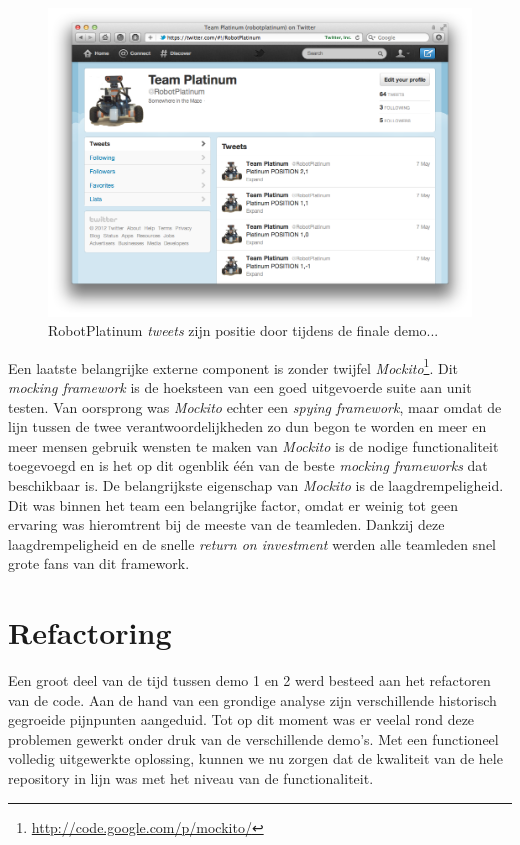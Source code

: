 \documentclass[12pt,a4paper]{report}
\begin{document}
\begin{figure}[htbp]
  \centering
  \includegraphics[width=120mm]{resources/twitter.png}
  \caption{RobotPlatinum \emph{tweets} zijn positie door tijdens de finale demo...}
  \label{fig:twitter}
\end{figure}

Een laatste belangrijke externe component is zonder twijfel \emph{Mockito}\footnote{\url{http://code.google.com/p/mockito/}}. Dit \emph{mocking framework} is de hoeksteen van een goed uitgevoerde suite aan unit testen. Van oorsprong was \emph{Mockito} echter een \emph{spying framework}, maar omdat de lijn tussen de twee verantwoordelijkheden zo dun begon te worden en meer en meer mensen gebruik wensten te maken van \emph{Mockito} is de nodige functionaliteit toegevoegd en is het op dit ogenblik \'e\'en van de beste \emph{mocking frameworks} dat beschikbaar is. De belangrijkste eigenschap van \emph{Mockito} is de laagdrempeligheid. Dit was binnen het team een belangrijke factor, omdat er weinig tot geen ervaring was hieromtrent bij de meeste van de teamleden. Dankzij deze laagdrempeligheid en de snelle \emph{return on investment} werden alle teamleden snel grote fans van dit framework.

\section{Refactoring}

Een groot deel van de tijd tussen demo 1 en 2 werd besteed aan het refactoren van de code. Aan de hand van een grondige analyse zijn verschillende historisch gegroeide pijnpunten aangeduid. Tot op dit moment was er veelal rond deze problemen gewerkt onder druk van de verschillende demo's. Met een functioneel volledig uitgewerkte oplossing, kunnen we nu zorgen dat de kwaliteit van de hele repository in lijn was met het niveau van de functionaliteit.
\end{document}
